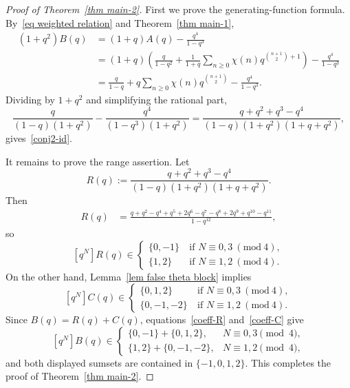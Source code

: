 \documentclass[10pt,a4paper]{amsart}
\numberwithin{equation}{section}
\newcommand{\Mod}[1]{\ (\mathrm{mod}\ #1)}
\begin{document}
\begin{proof}[Proof of Theorem~\ref{thm main-2}]
First we prove the generating-function formula. By~\eqref{eq weighted relation} and Theorem~\ref{thm main-1},
\begin{align*}
(1+q^2)B(q)
&=(1+q)A(q)-\frac{q^4}{1-q^3}\\
&=(1+q)\left(\frac{q}{1-q^2}+\frac{1}{1+q}\sum_{n\ge 0}\chi(n)q^{\binom{n+1}{2}+1}\right)-\frac{q^4}{1-q^3}\\
&=\frac{q}{1-q}+q\sum_{n\ge 0}\chi(n)q^{\binom{n+1}{2}}-\frac{q^4}{1-q^3}.
\end{align*}
Dividing by $1+q^2$ and simplifying the rational part,
\[
\frac{q}{(1-q)(1+q^2)}-\frac{q^4}{(1-q^3)(1+q^2)}
=\frac{q+q^2+q^3-q^4}{(1-q)(1+q^2)(1+q+q^2)},
\]
gives~\eqref{conj2-id}.

It remains to prove the range assertion.  Let
\[
R(q):= \frac{q+q^2+q^3-q^4}{(1-q)(1+q^2)(1+q+q^2)}.
\]
Then
\begin{align*}
R(q)
&=\frac{q+q^2-q^4+q^5+2q^6-q^7-q^8+2q^9+q^{10}-q^{11}}{1-q^{12}},
\end{align*}
so
\begin{equation}\label{coeff-R}
[q^N] R(q)
\in\begin{cases}
\{0,-1\} &\ \text{if\ } N\equiv 0,3\Mod{4}, \\
\{1,2\} & \ \text{if\ } N\equiv 1,2\Mod{4}.
\end{cases}
\end{equation}
On the other hand, Lemma~\ref{lem false theta block} implies
\begin{equation}\label{coeff-C}
[q^N] C(q)
\in\begin{cases}
\{0,1,2\} &\ \text{if\ } N\equiv 0,3\Mod{4}, \\
\{0,-1,-2\} &\ \text{if\ } N\equiv 1,2\Mod{4}.
\end{cases}
\end{equation}
Since $B(q)=R(q)+C(q)$, equations~\eqref{coeff-R} and~\eqref{coeff-C} give
\[
[q^N]B(q)\in
\begin{cases}
\{0,-1\}+\{0,1,2\}, & N\equiv 0,3\pmod 4,\\
\{1,2\}+\{0,-1,-2\}, & N\equiv 1,2\pmod 4,
\end{cases}
\]
and both displayed sumsets are contained in $\{-1,0,1,2\}$.  This completes the proof of Theorem~\ref{thm main-2}.
\end{proof}
\end{document}
